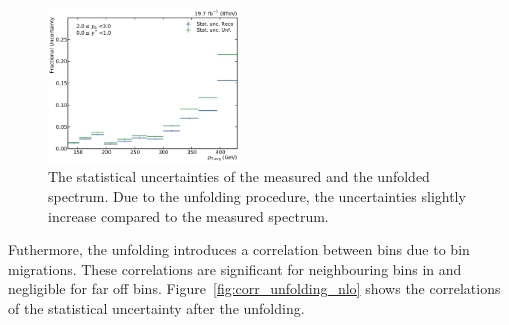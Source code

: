\begin{figure}[htbp]
    \includegraphics[width=0.45\textwidth]{figures/measurement/statunc_fractional_yb2ys0.pdf}
    \caption{The statistical uncertainties of the measured and the unfolded spectrum. Due
    to the unfolding procedure, the uncertainties slightly increase compared to the
    measured spectrum.}
    \label{fig:statunc_relative}
\end{figure}

Futhermore, the unfolding introduces a correlation between bins due to bin
migrations. These correlations are significant for neighbouring bins in \pt and
negligible for far off bins. Figure~\ref{fig:corr_unfolding_nlo} shows the
correlations of the statistical uncertainty after the unfolding.

